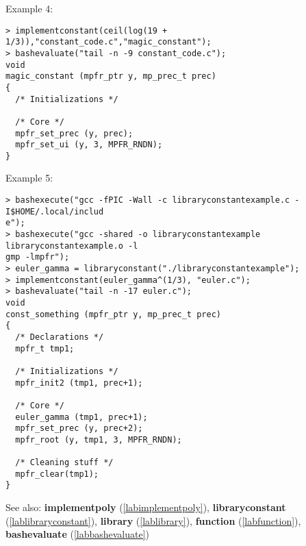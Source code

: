 \noindent Example 4: 
\begin{center}\begin{minipage}{15cm}\begin{Verbatim}[frame=single]
> implementconstant(ceil(log(19 + 1/3)),"constant_code.c","magic_constant");
> bashevaluate("tail -n -9 constant_code.c");
void
magic_constant (mpfr_ptr y, mp_prec_t prec)
{
  /* Initializations */

  /* Core */
  mpfr_set_prec (y, prec);
  mpfr_set_ui (y, 3, MPFR_RNDN);
}
\end{Verbatim}
\end{minipage}\end{center}
\noindent Example 5: 
\begin{center}\begin{minipage}{15cm}\begin{Verbatim}[frame=single]
> bashexecute("gcc -fPIC -Wall -c libraryconstantexample.c -I$HOME/.local/includ
e");
> bashexecute("gcc -shared -o libraryconstantexample libraryconstantexample.o -l
gmp -lmpfr");
> euler_gamma = libraryconstant("./libraryconstantexample");
> implementconstant(euler_gamma^(1/3), "euler.c");
> bashevaluate("tail -n -17 euler.c");
void
const_something (mpfr_ptr y, mp_prec_t prec)
{
  /* Declarations */
  mpfr_t tmp1;

  /* Initializations */
  mpfr_init2 (tmp1, prec+1);

  /* Core */
  euler_gamma (tmp1, prec+1);
  mpfr_set_prec (y, prec+2);
  mpfr_root (y, tmp1, 3, MPFR_RNDN);

  /* Cleaning stuff */
  mpfr_clear(tmp1);
}
\end{Verbatim}
\end{minipage}\end{center}
See also: \textbf{implementpoly} (\ref{labimplementpoly}), \textbf{libraryconstant} (\ref{lablibraryconstant}), \textbf{library} (\ref{lablibrary}), \textbf{function} (\ref{labfunction}), \textbf{bashevaluate} (\ref{labbashevaluate})
